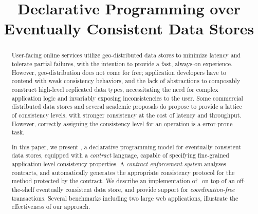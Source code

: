 \documentclass[pldi,nocopyrightspace]{sigplanconf}
\begin{document}
%
%

\title{Declarative Programming over Eventually Consistent Data Stores }

\maketitle
\begin{abstract}
User-facing online services utilize geo-distributed data stores to minimize
latency and tolerate partial failures, with the intention to provide a fast,
always-on experience. However, geo-distribution does not come for free;
application developers have to contend with weak consistency behaviors, and
the lack of abstractions to composably construct high-level replicated data
types, necessitating the need for complex application logic and invariably
exposing inconsistencies to the user. Some commercial distributed data
stores and several academic proposals do propose to provide a lattice of
consistency levels, with stronger consistency at the cost of latency and
throughput. However, correctly assigning the consistency level for an
operation is a error-prone task.

In this paper, we present \name, a declarative programming model for
eventually consistent data stores, equipped with a \emph{contract} language,
capable of specifying fine-grained application-level consistency
properties. A \emph{contract enforcement system} analyses contracts, and
automatically generates the appropriate consistency protocol for the method
protected by the contract. We describe an implementation of \name\ on top of
an off-the-shelf eventually consistent data store, and provide support for
\emph{coordination-free} transactions. Several benchmarks including two
large web applications, illustrate the effectiveness of our approach.
\end{abstract}




















\small

\end{document}

